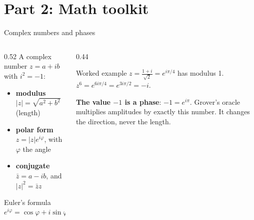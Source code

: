 \documentclass[aspectratio=169,11pt]{beamer}
\newcommand{\key}[1]{{\color{qdark}\textbf{#1}}}
\begin{document}
\section{Part 2: Math toolkit}
\begin{frame}{Complex numbers and phases}
  \begin{columns}[T]
    \begin{column}{0.52\textwidth}
      A complex number $z = a + ib$ with $i^2 = -1$:
      \begin{itemize}
        \item \key{modulus} $|z| = \sqrt{a^2 + b^2}$ (length)
        \item \key{polar form} $z = |z|e^{i\varphi}$, with $\varphi$ the angle
        \item \key{conjugate} $\bar z = a - ib$, and $|z|^2 = \bar zz$
      \end{itemize}
      \begin{block}{Euler's formula}
        \[ e^{i\varphi} = \cos\varphi + i\sin\varphi, \qquad |e^{i\varphi}| = 1 \]
      \end{block}
    \end{column}
    \begin{column}{0.44\textwidth}
      \begin{exampleblock}{Worked example}
        $z = \frac{1 + i}{\sqrt2} = e^{i\pi/4}$ has modulus 1.\\[1mm]
        $z^6 = e^{6i\pi/4} = e^{3i\pi/2} = -i$.
      \end{exampleblock}
      \vspace{1mm}
      \key{The value $-1$ is a phase}: $-1 = e^{i\pi}$. Grover's oracle multiplies amplitudes by exactly this number. It changes the direction, never the length.
    \end{column}
  \end{columns}
\end{frame}
\end{document}
